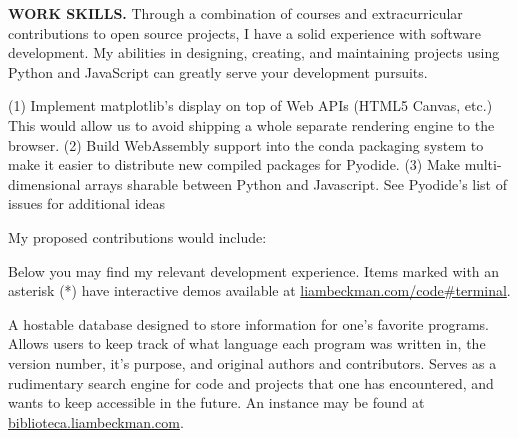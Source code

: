 \textbf{WORK SKILLS.} Through a combination of courses and extracurricular contributions to open source projects, I have a solid experience with software development. My abilities in designing, creating, and maintaining projects using Python and JavaScript can greatly serve your development pursuits.

\medbreak


 (1) Implement matplotlib's display on top of Web APIs (HTML5 Canvas, etc.) This would allow us to avoid shipping a whole separate rendering engine to the browser. 
 (2) Build WebAssembly support into the conda packaging system to make it easier to distribute new compiled packages for Pyodide.
 (3) Make multi-dimensional arrays sharable between Python and Javascript. See Pyodide's list of issues for additional ideas

My proposed contributions would include:

\begin{itemize}
    \myItem{}
\end{itemize}

\medbreak





Below you may find my relevant development experience. Items marked with an asterisk (*) have interactive demos available at \textcolor{my-blue}{\href{https://liambeckman.com/code\#terminal}{liambeckman.com/code\#terminal}}.

\medbreak



A hostable database designed to store information for one's favorite programs. Allows users to keep track of what language each program was written in, the version number, it's purpose, and original authors and contributors. Serves as a rudimentary search engine for code and projects that one has encountered, and wants to keep accessible in the future. An instance may be found at \textcolor{my-blue}{\href{https://biblioteca.liambeckman.com}{biblioteca.liambeckman.com}}.

